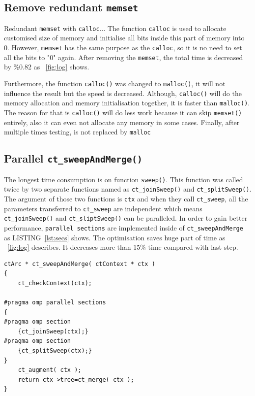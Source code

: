 \documentclass[conference]{IEEEtran}
\newcommand{\fref}[1]{\figurename~\ref{#1}}
\newcommand{\lref}[1]{LISTING~\ref{#1}}
\begin{document}
\subsection{Remove redundant \texttt{memset}}

Redundant \texttt{memset} with \texttt{calloc}...
The function \texttt{calloc} is used to allocate customised size of memory and initialise all bits inside this part of memory into 0. However, \texttt{memset} has the same purpose as the \texttt{calloc}, so it is no need to set all the bits to "0" again. After removing the \texttt{memset}, the total time is decreased by \%0.82 as \fref{fig:log} shows. 

Furthermore, the function \texttt{calloc()} was changed to \texttt{malloc()}, it will not influence the result but the speed is decreased. Although, \texttt{calloc()} will do the memory allocation and memory initialisation together, it is faster than \texttt{malloc()}. The reason for that is \texttt{calloc()} will do less work because it can skip \texttt{memset()} entirely, also it can even not allocate any memory in some cases. Finally, after multiple times testing, \cite{calloc} is not replaced by \texttt{malloc}

\subsection{Parallel \texttt{ct\_sweepAndMerge()}}
The longest time consumption is on function \texttt{sweep()}. This function was called twice by two separate functions named as \texttt{ct\_joinSweep()} and \texttt{ct\_splitSweep()}. The argument of those two functions is \texttt{ctx} and when they call \texttt{ct\_sweep}, all the parameters transferred to \texttt{ct\_sweep} are independent which means \texttt{ct\_joinSweep()} and \texttt{ct\_sliptSweep()} can be paralleled. In order to gain better performance, \texttt{parallel sections} are implemented inside of \texttt{ct\_sweepAndMerge} as \lref{lst:secs} shows. The optimisation saves huge part of time as \fref{fig:log} describes. It decreases more than 15\% time compared with last step. 
\begin{lstlisting}[caption={Data Load with SIMD Intrinsics},captionpos=b,label=lst:secs]
ctArc * ct_sweepAndMerge( ctContext * ctx )
{
	ct_checkContext(ctx);
	
#pragma omp parallel sections    
{    
#pragma omp section
    {ct_joinSweep(ctx);}
#pragma omp section
    {ct_splitSweep(ctx);}
}   
    ct_augment( ctx );
    return ctx->tree=ct_merge( ctx );
}
\end{lstlisting}
\end{document}
